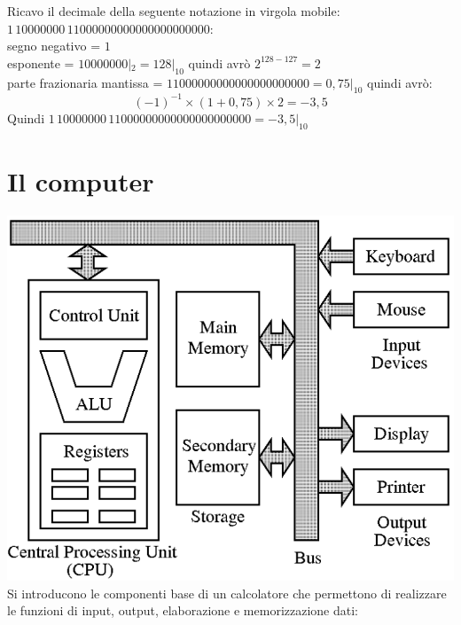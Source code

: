 \documentclass[a4paper,12pt, oneside]{book}
\begin{document}
\begin{esercizio}
Ricavo il decimale della seguente notazione in virgola mobile: $1\,10000000\,11000000000000000000000$:\\
segno negativo = $1$\\
esponente = $10000000|_2=128|_{10}$ quindi avrò $2^{128-127}=2$\\
parte frazionaria mantissa = $11000000000000000000000=0,75|_{10}$
quindi avrò: 
$$(-1)^{-1}\times (1+0,75)\times 2= -3,5$$
Quindi $1\,10000000\,11000000000000000000000=-3,5|_{10}$
\end{esercizio}

\chapter{Il computer}
\includegraphics[scale=0.5]{img/computer.png}\\
Si introducono le componenti base di un calcolatore che permettono di realizzare le funzioni di input, output, elaborazione e memorizzazione dati:
\end{document}

